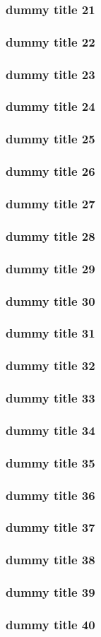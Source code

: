 \begin{frame} \frametitle{dummy title 21} \end{frame}
\begin{frame} \frametitle{dummy title 22} \end{frame}
\begin{frame} \frametitle{dummy title 23} \end{frame}
\begin{frame} \frametitle{dummy title 24} \end{frame}
\begin{frame} \frametitle{dummy title 25} \end{frame}
\begin{frame} \frametitle{dummy title 26} \end{frame}
\begin{frame} \frametitle{dummy title 27} \end{frame}
\begin{frame} \frametitle{dummy title 28} \end{frame}
\begin{frame} \frametitle{dummy title 29} \end{frame}
\begin{frame} \frametitle{dummy title 30} \end{frame}
\begin{frame} \frametitle{dummy title 31} \end{frame}
\begin{frame} \frametitle{dummy title 32} \end{frame}
\begin{frame} \frametitle{dummy title 33} \end{frame}
\begin{frame} \frametitle{dummy title 34} \end{frame}
\begin{frame} \frametitle{dummy title 35} \end{frame}
\begin{frame} \frametitle{dummy title 36} \end{frame}
\begin{frame} \frametitle{dummy title 37} \end{frame}
\begin{frame} \frametitle{dummy title 38} \end{frame}
\begin{frame} \frametitle{dummy title 39} \end{frame}
\begin{frame} \frametitle{dummy title 40} \end{frame}
